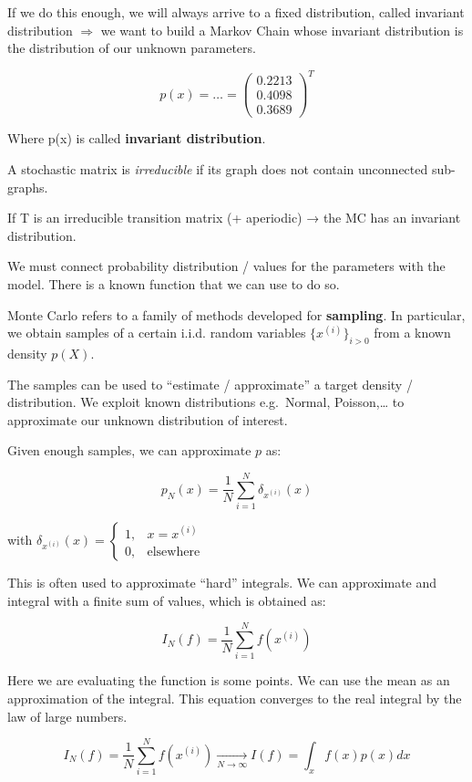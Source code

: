 If we do this enough, we will always arrive to a fixed distribution,
called invariant distribution $\Rightarrow$ we want to build a Markov
Chain whose invariant distribution is the distribution of our unknown
parameters.

$$
p(x)=\dots = \begin{pmatrix} 0.2213 \\ 0.4098 \\ 0.3689\end{pmatrix}^T
$$

Where p(x) is called \textbf{invariant distribution}.

A stochastic matrix is \emph{irreducible} if its graph does not contain
unconnected sub-graphs.

If T is an irreducible transition matrix (+ aperiodic) → the MC has an
invariant distribution.

We must connect probability distribution / values for the parameters
with the model. There is a known function that we can use to do so.

Monte Carlo refers to a family of methods developed for
\textbf{sampling}. In particular, we obtain samples of a certain i.i.d.
random variables $\{x^{(i)}\}_{i>0}$ from a known density $p(X)$.

The samples can be used to ``estimate / approximate'' a target density /
distribution. We exploit known distributions e.g.~Normal,
Poisson,\ldots{} to approximate our unknown distribution of interest.

Given enough samples, we can approximate $p$ as:

$$
p_N(x)= \frac{1}{N}\sum^N_{i=1}\delta_{x^{(i)}}(x)
$$

with
$\delta_{x^{(i)}}(x)= \begin{cases}1, & x=x^{(i)} \\ 0, & \text{elsewhere}\end{cases}$

This is often used to approximate ``hard'' integrals. We can approximate
and integral with a finite sum of values, which is obtained as:

$$
I_N(f)=\frac{1}{N} \sum^N_{i=1} f(x^{(i)})
$$

Here we are evaluating the function is some points. We can use the mean
as an approximation of the integral. This equation converges to the real
integral by the law of large numbers.

$$
I_N(f)=\frac{1}{N} \sum^N_{i=1} f(x^{(i)})  \xrightarrow[N \rightarrow \infty  ]{}   I(f)= \int_x f(x)p(x)dx
$$

